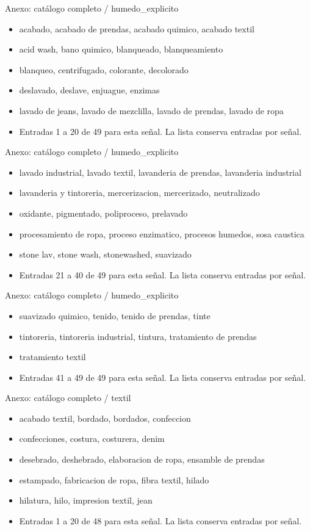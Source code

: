 \documentclass[aspectratio=169,10pt]{beamer}
\begin{document}
\begin{frame}{Anexo: catálogo completo / humedo\_explicito}
\small
\begin{itemize}
\item acabado, acabado de prendas, acabado quimico, acabado textil
\item acid wash, bano quimico, blanqueado, blanqueamiento
\item blanqueo, centrifugado, colorante, decolorado
\item deslavado, deslave, enjuague, enzimas
\item lavado de jeans, lavado de mezclilla, lavado de prendas, lavado de ropa
\item Entradas 1 a 20 de 49 para esta señal. La lista conserva entradas por señal.
\end{itemize}
\end{frame}
\begin{frame}{Anexo: catálogo completo / humedo\_explicito}
\small
\begin{itemize}
\item lavado industrial, lavado textil, lavanderia de prendas, lavanderia industrial
\item lavanderia y tintoreria, mercerizacion, mercerizado, neutralizado
\item oxidante, pigmentado, poliproceso, prelavado
\item procesamiento de ropa, proceso enzimatico, procesos humedos, sosa caustica
\item stone lav, stone wash, stonewashed, suavizado
\item Entradas 21 a 40 de 49 para esta señal. La lista conserva entradas por señal.
\end{itemize}
\end{frame}
\begin{frame}{Anexo: catálogo completo / humedo\_explicito}
\small
\begin{itemize}
\item suavizado quimico, tenido, tenido de prendas, tinte
\item tintoreria, tintoreria industrial, tintura, tratamiento de prendas
\item tratamiento textil
\item Entradas 41 a 49 de 49 para esta señal. La lista conserva entradas por señal.
\end{itemize}
\end{frame}
\begin{frame}{Anexo: catálogo completo / textil}
\small
\begin{itemize}
\item acabado textil, bordado, bordados, confeccion
\item confecciones, costura, costurera, denim
\item desebrado, deshebrado, elaboracion de ropa, ensamble de prendas
\item estampado, fabricacion de ropa, fibra textil, hilado
\item hilatura, hilo, impresion textil, jean
\item Entradas 1 a 20 de 48 para esta señal. La lista conserva entradas por señal.
\end{itemize}
\end{frame}
\end{document}
